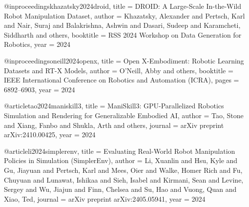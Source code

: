 @inproceedings{khazatsky2024droid,
  title     = {{DROID}: A Large-Scale In-the-Wild Robot Manipulation Dataset},
  author    = {Khazatsky, Alexander and Pertsch, Karl and Nair, Suraj and
               Balakrishna, Ashwin and Dasari, Sudeep and Karamcheti, Siddharth
               and others},
  booktitle = {RSS 2024 Workshop on Data Generation for Robotics},
  year      = {2024}
}

@inproceedings{oneill2024openx,
  title     = {Open {X}-Embodiment: Robotic Learning Datasets and {RT-X} Models},
  author    = {O'Neill, Abby and others},
  booktitle = {IEEE International Conference on Robotics and Automation (ICRA)},
  pages     = {6892--6903},
  year      = {2024}
}

@article{tao2024maniskill3,
  title   = {{ManiSkill3}: GPU-Parallelized Robotics Simulation and Rendering for
             Generalizable Embodied AI},
  author  = {Tao, Stone and Xiang, Fanbo and Shukla, Arth and others},
  journal = {arXiv preprint arXiv:2410.00425},
  year    = {2024}
}

@article{li2024simplerenv,
  title   = {Evaluating Real-World Robot Manipulation Policies in Simulation
             ({SimplerEnv})},
  author  = {Li, Xuanlin and Hsu, Kyle and Gu, Jiayuan and Pertsch, Karl
             and Mees, Oier and Walke, Homer Rich and Fu, Chuyuan
             and Lunawat, Ishikaa and Sieh, Isabel and Kirmani, Sean
             and Levine, Sergey and Wu, Jiajun and Finn, Chelsea
             and Su, Hao and Vuong, Quan and Xiao, Ted},
  journal = {arXiv preprint arXiv:2405.05941},
  year    = {2024}
}

